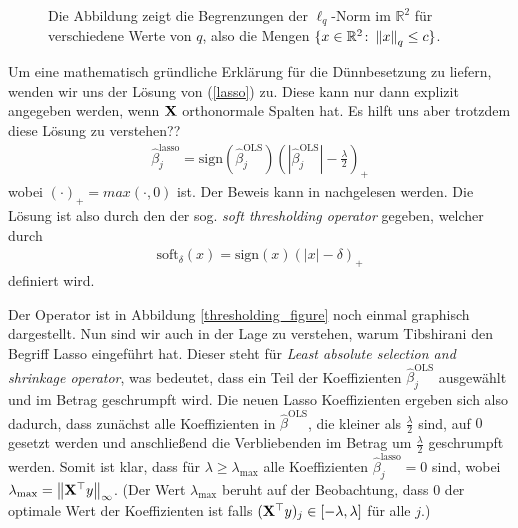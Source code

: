 \begin{figure}
\caption{Die Abbildung zeigt die Begrenzungen der $\ell_q$-Norm im $\mathbb{R}^2$ für verschiedene Werte von $q$, also die Mengen $\{x \in \mathbb{R}^2 \colon \left\lVert x \right\rVert_{q} \leq c \}$.}
\label{norm_figure}
\end{figure}

Um eine mathematisch gründliche Erklärung für die Dünnbesetzung zu liefern, wenden wir uns der Lösung von (\ref{lasso}) zu. Diese kann nur dann explizit angegeben werden, wenn $\mathbf{X}$ orthonormale Spalten hat. Es hilft uns aber trotzdem diese Lösung zu verstehen??
\begin{align}
\hat{\beta}_j^{\text{lasso}} = \text{sign}(\hat{\beta}_j^{\text{OLS}}) \left(\left|\hat{\beta}_j^{\text{OLS}}\right| - \frac{\lambda}{2}\right)_{+}
\end{align}
wobei $(\cdot)_+ = max(\cdot, 0)$ ist. Der Beweis kann in \cite{murphy} nachgelesen werden. Die Lösung ist also durch den der sog. \textit{soft thresholding operator} gegeben, welcher durch
\begin{align}
\text{soft}_{\delta}(x) = \text{sign}(x)(|x| - \delta)_+
\end{align}
definiert wird.

Der Operator ist in Abbildung \ref{thresholding_figure} noch einmal graphisch dargestellt. Nun sind wir auch in der Lage zu verstehen, warum Tibshirani \cite{tibshirani_lasso} den Begriff Lasso eingeführt hat. Dieser steht für \textit{Least absolute selection and shrinkage operator}, was bedeutet, dass ein Teil der Koeffizienten $\hat{\beta}_j^{\text{OLS}}$ ausgewählt und im Betrag geschrumpft wird. Die neuen Lasso Koeffizienten ergeben sich also dadurch, dass zunächst alle Koeffizienten in $\hat{\beta}^{\text{OLS}}$, die kleiner als $\frac{\lambda}{2}$ sind, auf $0$ gesetzt werden und anschließend die Verbliebenden im Betrag um $\frac{\lambda}{2}$ geschrumpft werden. Somit ist klar, dass für $\lambda \geq \lambda_{\text{max}}$ alle Koeffizienten $\hat{\beta}_j^{\text{lasso}} = 0$ sind, wobei $\lambda_{\text{max}} = \left\lVert \mathbf{X}^{\top}y \right\rVert_{\infty}$. (Der Wert $\lambda_{\text{max}}$ beruht auf der Beobachtung, dass $0$ der optimale Wert der Koeffizienten ist falls $(\mathbf{X}^{\top}y)_j \in [-\lambda, \lambda]$ für alle $j$.) 

